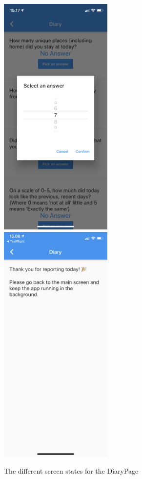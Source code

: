 \begin{figure}
    \includegraphics[width=0.5\textwidth]{images/app_imgs/app_answering.png}
    \includegraphics[width=0.5\textwidth]{images/app_imgs/app_submitted.png}
    \caption{The different screen states for the DiaryPage}
    \label{fig:my_label}
\end{figure}

